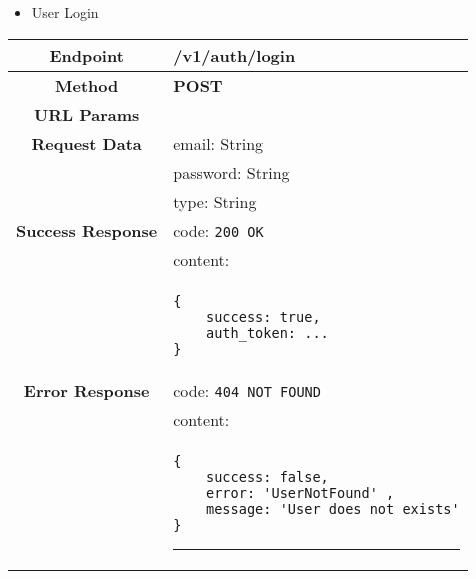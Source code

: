     \begin{itemize}
        \item User Login
    \end{itemize}
    \begin{adjustwidth}{1cm}{}
        \begin{longtable}{|c|l|}
            \hline
            \textbf{Endpoint} & /v1/auth/login \\
            \hline
            \textbf{Method} & \textbf{POST} \\
            \hline
            \textbf{URL Params} &  \\
            \hline
            \textbf{Request Data} & email: String \\
            &                 password: String \\
            &                 type: String \\
            \hline
            \textbf{Success Response} & code: \texttt{200 OK} \\
            &                           content: \\
            & \begin{minipage}[t]{0.5\textwidth}
                \begin{adjustwidth}{1.5cm}{}
                \begin{verbatim}
{
    success: true, 
    auth_token: ...
}
                \end{verbatim}
                \end{adjustwidth}
              \end{minipage} \\
              \hline
            \textbf{Error Response} & code: \texttt{404 NOT FOUND} \\
            &                         content: \\
            & \begin{minipage}[t]{0.7\textwidth}
                \begin{adjustwidth}{1.5cm}{}
                \begin{verbatim}
{
    success: false, 
    error: 'UserNotFound' ,
    message: 'User does not exists'
}
                \end{verbatim}
                \end{adjustwidth}
                \par\noindent\rule{\textwidth}{1pt}
                \vspace{4pt}
              \end{minipage} \\

\end{longtable}
\end{adjustwidth}
